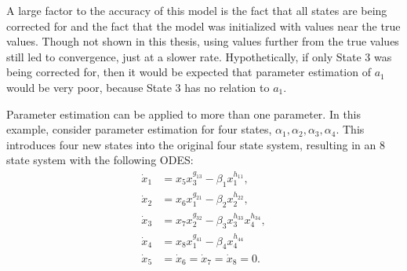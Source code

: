 \noindent A large factor to the accuracy of this model is the fact that all states are being corrected for and the fact that the model was initialized with values near the true values. Though not shown in this thesis, using values further from the true values still led to convergence, just at a slower rate. Hypothetically, if only State 3 was being corrected for, then it would be expected that parameter estimation of $a_1$ would be very poor, because State 3 has no relation to $a_1$.



\clearpage

\noindent Parameter estimation can be applied to more than one parameter. In this example, consider parameter estimation for four states, $\alpha_1, \alpha_2, \alpha_3, \alpha_4$. This introduces four new states into the original four state system, resulting in an 8 state system with the following ODES:
\begin{align*}
\dot x_1 &= x_5  x_3^{g_{13}} - \beta_1 x_1^{h_{11}} , \\
\dot x_2 &= x_6  x_1^{g_{21}} - \beta_2 x_2^{h_{22}}, \\
\dot x_3 &= x_7  x_2^{g_{32}} - \beta_3 x_3^{h_{33}} x_4^{h_{34}}, \\
\dot x_4 &= x_8   x_1^{g_{41}} - \beta_4 x_4^{h_{44}} \\
\dot x_5 &= \dot x_6= \dot x_7 = \dot x_8 = 0.
\end{align*}




